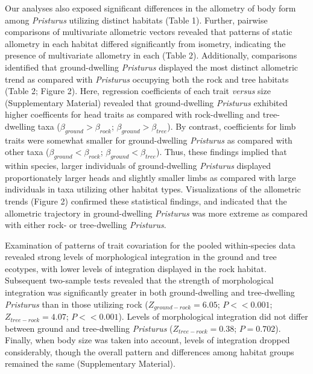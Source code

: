\documentclass[
  11pt,
]{article}
\begin{document}
Our analyses also exposed significant differences in the allometry of
body form among \emph{Pristurus} utilizing distinct habitats (Table 1).
Further, pairwise comparisons of multivariate allometric vectors
revealed that patterns of static allometry in each habitat differed
significantly from isometry, indicating the presence of multivariate
allometry in each (Table 2). Additionally, comparisons identified that
ground-dwelling \emph{Pristurus} displayed the most distinct allometric
trend as compared with \emph{Pristurus} occupying both the rock and tree
habitats (Table 2; Figure 2). Here, regression coefficients of each
trait \emph{versus} size (Supplementary Material) revealed that
ground-dwelling \emph{Pristurus} exhibited higher coefficents for head
traits as compared with rock-dwelling and tree-dwelling taxa
(\(\beta_{ground}>\beta_{rock}\); \(\beta_{ground}>\beta_{tree}\)). By
contrast, coefficients for limb traits were somewhat smaller for
ground-dwelling \emph{Pristurus} as compared with other taxa
(\(\beta_{ground}<\beta_{rock}\); \(\beta_{ground}<\beta_{tree}\)).
Thus, these findings implied that within species, larger individuals of
ground-dwelling \emph{Pristurus} displayed proportionately larger heads
and slightly smaller limbs as compared with large individuals in taxa
utilizing other habitat types. Visualizations of the allometric trends
(Figure 2) confirmed these statistical findings, and indicated that the
allometric trajectory in ground-dwelling \emph{Pristurus} was more
extreme as compared with either rock- or tree-dwelling \emph{Pristurus}.
\hfill\break

Examination of patterns of trait covariation for the pooled
within-species data revealed strong levels of morphological integration
in the ground and tree ecotypes, with lower levels of integration
displayed in the rock habitat. Subsequent two-sample tests revealed that
the strength of morphological integration was significantly greater in
both ground-dwelling and tree-dwelling \emph{Pristurus} than in those
utilizing rock (\(Z_{ground-rock}=6.05\); \(P << 0.001\);
\(Z_{tree-rock}=4.07\); \(P << 0.001\)). Levels of morphological
integration did not differ between ground and tree-dwelling
\emph{Pristurus} (\(Z_{tree-rock}=0.38\); \(P = 0.702\)). Finally, when
body size was taken into account, levels of integration dropped
considerably, though the overall pattern and differences among habitat
groups remained the same (Supplementary Material). \hfill\break
\end{document}
